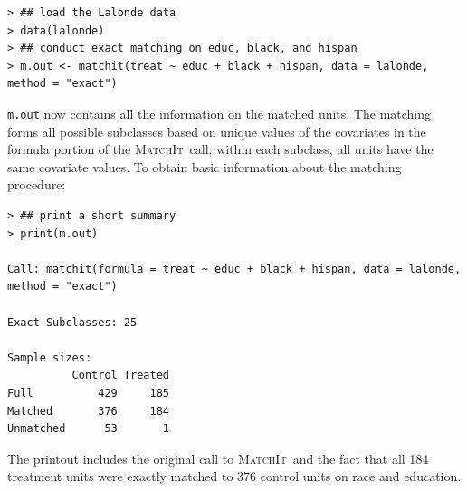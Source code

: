 \documentclass[oneside,letterpaper,titlepage]{article}
\newcommand{\MatchIt}{\textsc{MatchIt}}
\begin{document}
\begin{verbatim}
> ## load the Lalonde data
> data(lalonde)
> ## conduct exact matching on educ, black, and hispan
> m.out <- matchit(treat ~ educ + black + hispan, data = lalonde, method = "exact")
\end{verbatim}

\noindent \texttt{m.out} now contains all the information on the
matched units.  The matching forms all possible subclasses based on
unique values of the covariates in the formula portion of the
\MatchIt\ call; within each subclass, all units have the same
covariate values.  To obtain basic information about the matching
procedure:
\begin{verbatim}
> ## print a short summary
> print(m.out)

Call: matchit(formula = treat ~ educ + black + hispan, data = lalonde,     method = "exact")

Exact Subclasses: 25

Sample sizes:
          Control Treated
Full          429     185
Matched       376     184
Unmatched      53       1
\end{verbatim}
The printout includes the original call to \MatchIt\ and the fact that
all 184 treatment units were exactly matched to 376 control units on
race and education.  
\end{document}
